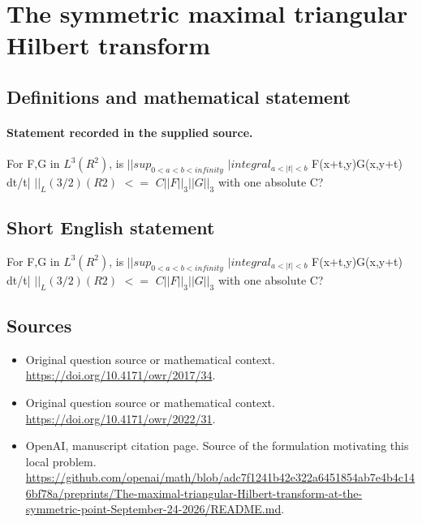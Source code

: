 \documentclass[11pt]{article}
\begin{document}
\section*{The symmetric maximal triangular Hilbert transform}\label{30007439}
\subsection{Definitions and mathematical statement}
\paragraph{Statement recorded in the supplied source.}
For F,G in $L^3(R^2)$, is $||sup_{0<a<b<infinity}$ $|integral_{a<|t|<b}$ F(x+t,y)G(x,y+t) dt/t| $||_L(3/2)(R2)$ $<=$ $C||F||_3||G||_3$ with one absolute C?
\subsection{Short English statement}
For F,G in $L^3(R^2)$, is $||sup_{0<a<b<infinity}$ $|integral_{a<|t|<b}$ F(x+t,y)G(x,y+t) dt/t| $||_L(3/2)(R2)$ $<=$ $C||F||_3||G||_3$ with one absolute C?
\subsection{Sources}
\begin{itemize}
\item[S1] Original question source or mathematical context.
\url{https://doi.org/10.4171/owr/2017/34}.
\item[S2] Original question source or mathematical context.
\url{https://doi.org/10.4171/owr/2022/31}.
\item[S3] OpenAI, manuscript citation page. Source of the formulation motivating this local problem.
\url{https://github.com/openai/math/blob/adc7f1241b42e322a6451854ab7e4b4c146bf78a/preprints/The-maximal-triangular-Hilbert-transform-at-the-symmetric-point-September-24-2026/README.md}.
\end{itemize}
\end{document}
